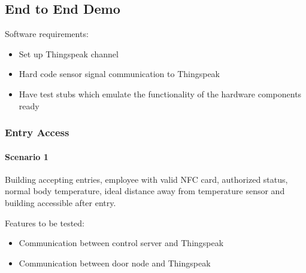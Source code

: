 \subsection{End to End Demo}

\noindent
Software requirements:
\begin{itemize}
    \item Set up Thingspeak channel 
    \item Hard code sensor signal communication to Thingspeak 
    \item Have test stubs which emulate the functionality of the hardware
          components ready
\end{itemize}

\subsubsection*{Entry Access}

\paragraph{Scenario 1}
Building accepting entries, employee with valid NFC card, authorized status,
normal body temperature, ideal distance away from temperature sensor and
building accessible after entry.

\noindent
Features to be tested:
\begin{itemize}
    \item Communication between control server and Thingspeak
    \item Communication between door node and Thingspeak
\end{itemize}

